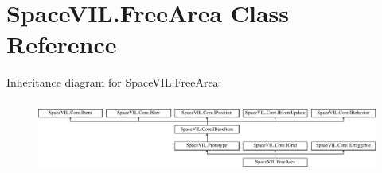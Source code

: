 \hypertarget{class_space_v_i_l_1_1_free_area}{}\section{Space\+V\+I\+L.\+Free\+Area Class Reference}
\label{class_space_v_i_l_1_1_free_area}
Inheritance diagram for Space\+V\+I\+L.\+Free\+Area\+:\begin{figure}[H]
\begin{center}
\leavevmode
\includegraphics[height=2.421622cm]{class_space_v_i_l_1_1_free_area}
\end{center}
\end{figure}

